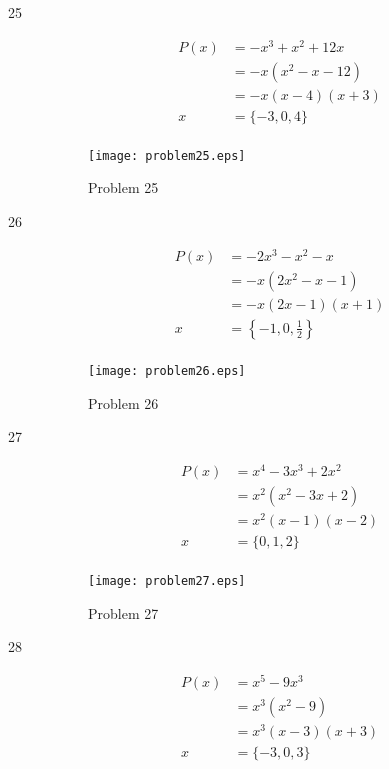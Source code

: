 \documentclass{exam}
\begin{document}
\begin{description}
    \item[25] 
      \begin{align*}
        P(x) &= -x^3 + x^2 + 12x \\
             &= -x(x^2 - x - 12) \\
             &= -x(x - 4)(x + 3) \\
        x    &= \{ -3, 0, 4 \} \\
      \end{align*}
      
      \begin{figure}[H]
        \centering
        \texttt{[image: problem25.eps]}
        \caption*{Problem 25}
      \end{figure}

    \item[26] 
      \begin{align*}
        P(x) &= -2x^3 - x^2 - x \\
             &= -x(2x^2 - x - 1) \\
             &= -x(2x - 1)(x + 1) \\
        x    &= \left\{ -1, 0, \frac{1}{2} \right\} \\
      \end{align*}
      
      \begin{figure}[H]
        \centering
        \texttt{[image: problem26.eps]}
        \caption*{Problem 26}
      \end{figure}

    \item[27] 
      \begin{align*}
        P(x) &= x^4 - 3x^3 + 2x^2 \\
             &= x^2(x^2 - 3x + 2) \\
             &= x^2(x - 1)(x - 2) \\
        x    &= \{ 0, 1, 2 \} \\
      \end{align*}
      
      \begin{figure}[H]
        \centering
        \texttt{[image: problem27.eps]}
        \caption*{Problem 27}
      \end{figure}

    \pagebreak

    \item[28] 
      \begin{align*}
        P(x) &= x^5 - 9x^3 \\
             &= x^3(x^2 - 9) \\
             &= x^3(x - 3)(x + 3) \\
        x    &= \{ -3, 0, 3 \} \\
      \end{align*}
      

\end{description}
\end{document}
